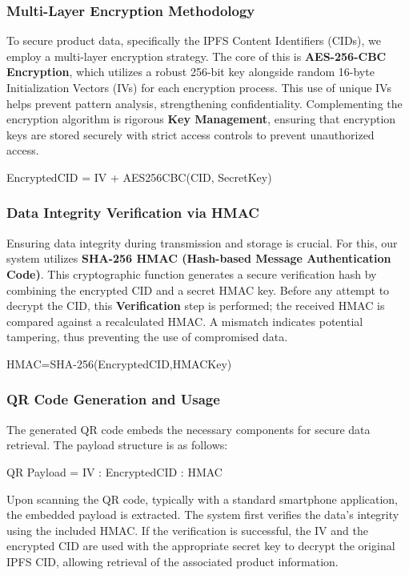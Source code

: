 \documentclass[conference]{IEEEtran}
\begin{document}
\subsubsection{\bfseries Multi-Layer Encryption Methodology}

To secure product data, specifically the IPFS Content Identifiers (CIDs), we employ a multi-layer encryption strategy. The core of this is \textbf{AES-256-CBC Encryption}, which utilizes a robust 256-bit key alongside random 16-byte Initialization Vectors (IVs) for each encryption process. This use of unique IVs helps prevent pattern analysis, strengthening confidentiality. Complementing the encryption algorithm is rigorous \textbf{Key Management}, ensuring that encryption keys are stored securely with strict access controls to prevent unauthorized access.

EncryptedCID = IV + AES\text{-}256\text{-}CBC(CID, SecretKey)

\subsubsection{\bfseries Data Integrity Verification via HMAC}

Ensuring data integrity during transmission and storage is crucial. For this, our system utilizes \textbf{SHA-256 HMAC (Hash-based Message Authentication Code)}. This cryptographic function generates a secure verification hash by combining the encrypted CID and a secret HMAC key. Before any attempt to decrypt the CID, this \textbf{Verification} step is performed; the received HMAC is compared against a recalculated HMAC. A mismatch indicates potential tampering, thus preventing the use of compromised data.

HMAC=SHA-256(EncryptedCID,HMACKey)

\subsubsection{\bfseries QR Code Generation and Usage}

The generated QR code embeds the necessary components for secure data retrieval. The payload structure is as follows:

QR Payload = IV : EncryptedCID : HMAC

Upon scanning the QR code, typically with a standard smartphone application, the embedded payload is extracted. The system first verifies the data's integrity using the included HMAC. If the verification is successful, the IV and the encrypted CID are used with the appropriate secret key to decrypt the original IPFS CID, allowing retrieval of the associated product information.
\end{document}
